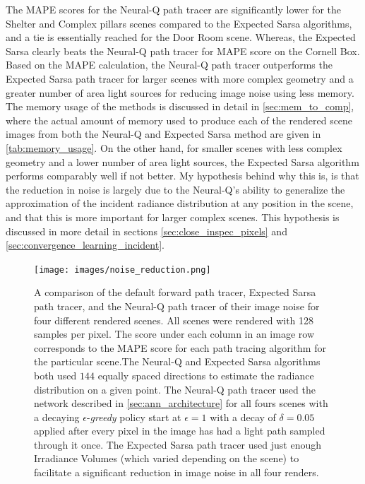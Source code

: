 \documentclass[../dissertation.tex]{subfiles}
\begin{document}
The MAPE scores for the Neural-Q path tracer are significantly lower for the Shelter and Complex pillars scenes compared to the Expected Sarsa algorithms, and a tie is essentially reached for the Door Room scene. Whereas, the Expected Sarsa clearly beats the Neural-Q path tracer for MAPE score on the Cornell Box. Based on the MAPE calculation, the Neural-Q path tracer outperforms the Expected Sarsa path tracer for larger scenes with more complex geometry and a greater number of area light sources for reducing image noise using less memory. The memory usage of the methods is discussed in detail in \ref{sec:mem_to_comp}, where the actual amount of memory used to produce each of the rendered scene images from both the Neural-Q and Expected Sarsa method are given in \ref{tab:memory_usage}. On the other hand, for smaller scenes with less complex geometry and a lower number of area light sources, the Expected Sarsa algorithm performs comparably well if not better. My hypothesis behind why this is, is that the reduction in noise is largely due to the Neural-Q's ability to generalize the approximation of the incident radiance distribution at any position in the scene, and that this is more important for larger complex scenes. This hypothesis is discussed in more detail in sections \ref{sec:close_inspec_pixels} and \ref{sec:convergence_learning_incident}.

\begin{figure}[hbtp]
\begin{center}
\texttt{[image: images/noise\_reduction.png]}    
\end{center}
\caption{A comparison of the default forward path tracer, Expected Sarsa path tracer, and the Neural-Q path tracer of their image noise for four different rendered scenes. All scenes were rendered with 128 samples per pixel. The score under each column in an image row corresponds to the MAPE score for each  path tracing algorithm for the particular scene.The Neural-Q and Expected Sarsa algorithms both used $144$ equally spaced directions to estimate the radiance distribution on a given point. The Neural-Q path tracer used the network described in \ref{sec:ann_architecture} for all fours scenes with a decaying $\epsilon$-\textit{greedy} policy start at $\epsilon =1$ with a decay of $\delta = 0.05$ applied after every pixel in the image has had a light path sampled through it once. The Expected Sarsa path tracer used just enough Irradiance Volumes (which varied depending on the scene) to facilitate a significant reduction in image noise in all four renders.}
\label{fig:mape_results_grid}
\end{figure}
\end{document}
